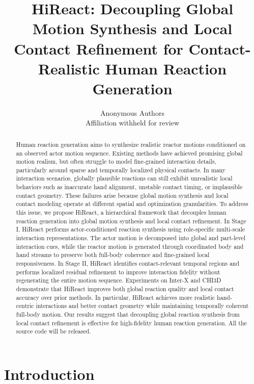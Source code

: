 \documentclass{article}
\title{HiReact: Decoupling Global Motion Synthesis and Local Contact Refinement for Contact-Realistic Human Reaction Generation}
\author{
Anonymous Authors \\
Affiliation withheld for review
}
\begin{document}
\maketitle

\begin{abstract}

Human reaction generation aims to synthesize realistic reactor motions conditioned on an observed actor motion sequence. Existing methods have achieved promising global motion realism, but often struggle to model fine-grained interaction details, particularly around sparse and temporally localized physical contacts. In many interaction scenarios, globally plausible reactions can still exhibit unrealistic local behaviors such as inaccurate hand alignment, unstable contact timing, or implausible contact geometry. These failures arise because global motion synthesis and local contact modeling operate at different spatial and optimization granularities.
To address this issue, we propose HiReact, a hierarchical framework that decouples human reaction generation into global motion synthesis and local contact refinement. In Stage I, HiReact performs actor-conditioned reaction synthesis using role-specific multi-scale interaction representations. The actor motion is decomposed into global and part-level interaction cues, while the reactor motion is generated through coordinated body and hand streams to preserve both full-body coherence and fine-grained local responsiveness. In Stage II, HiReact identifies contact-relevant temporal regions and performs localized residual refinement to improve interaction fidelity without regenerating the entire motion sequence.
Experiments on Inter-X and CHI3D demonstrate that HiReact improves both global reaction quality and local contact accuracy over prior methods. In particular, HiReact achieves more realistic hand-centric interactions and better contact geometry while maintaining temporally coherent full-body motion. Our results suggest that decoupling global reaction synthesis from local contact refinement is effective for high-fidelity human reaction generation.
All the source code will be released. 
\end{abstract}






\section{Introduction}
\end{document}
